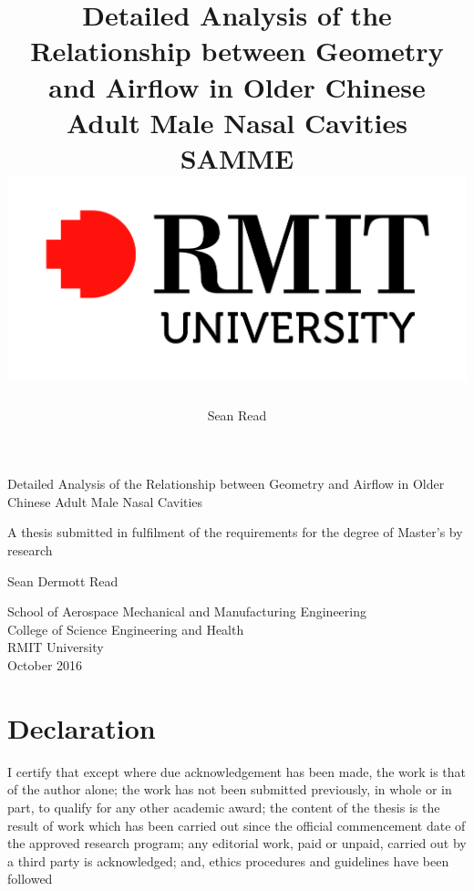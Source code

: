 \documentclass[12pt]{report}
\begin{document}
\pagestyle{title}
\title{
	{Detailed Analysis of the Relationship between Geometry and Airflow in Older Chinese Adult Male Nasal Cavities}\\
	{\large SAMME}\\
	{\includegraphics{rmit.jpg}}
}
\author{Sean Read}

    \begin{center}
        

      \vspace*{1cm}
        
	Detailed Analysis of the Relationship between Geometry and Airflow in Older Chinese Adult Male Nasal Cavities
        
        \vspace*{1cm}
        A thesis submitted in fulfilment of the requirements for the degree of Master’s by research
	\vspace{1.5cm}
        
        Sean Dermott Read
        
        \vspace{2.8cm}
        

        
	School of Aerospace Mechanical and Manufacturing Engineering\\
	\vspace{0.3cm}
        College of Science Engineering and Health\\
	\vspace{0.3cm}
	RMIT University\\
	\vspace{1cm}
	October 2016
        
    \end{center}
\onehalfspacing

 
\chapter*{Declaration}
\pagestyle{style1}
I certify that except where due acknowledgement has been made, the work is that of the author alone; the work has not been submitted previously, in whole or in part, to qualify for any other academic award; the content of the thesis is the result of work which has been carried out since the official commencement date of the approved research program; any editorial work, paid or unpaid, carried out by a third party is acknowledged; and, ethics procedures and guidelines have been followed\\
\end{document}
